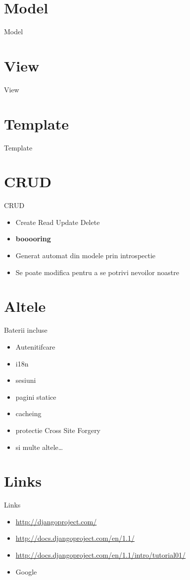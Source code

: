 \documentclass{beamer}
\begin{document}
\section{Model}
\begin{frame}{Model}
  
\end{frame}

\section{View}
\begin{frame}{View}
  
\end{frame}

\section{Template}
\begin{frame}{Template}
  
\end{frame}

\section{CRUD}
\begin{frame}{CRUD}
  \begin{itemize}
    \item Create Read Update Delete
    \pause
    \item \textbf{booooring}
    \pause
    \item Generat automat din modele prin introspectie 
    \pause
    \item Se poate modifica pentru a se potrivi nevoilor noastre
  \end{itemize}
\end{frame}

\section{Altele}
\begin{frame}{Baterii incluse}
  \begin{itemize}
    \item Autenitifcare
    \item i18n
    \item sesiuni
    \item pagini statice
    \item cacheing
    \item protectie Cross Site Forgery
    \item si multe altele\ldots 
  \end{itemize}
\end{frame}

\section{Links}
\begin{frame}{Links}
  \begin{itemize}
    \item \url{http://djangoproject.com/}
    \item \url{http://docs.djangoproject.com/en/1.1/}
    \item \url{http://docs.djangoproject.com/en/1.1/intro/tutorial01/}
    \item Google
  \end{itemize}
\end{frame}
\end{document}
